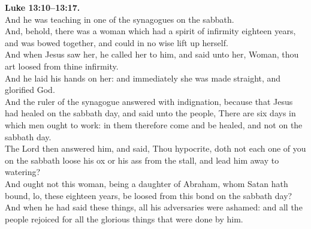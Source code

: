 \documentclass[10pt]{article} %
\begin{document}
{\begin{minipage}[t]{0.45\textwidth}
\textbf{Luke 13:10--13:17.}\\
And he was teaching in one of the synagogues on the sabbath.\\
And, behold, there was a woman which had a spirit of infirmity eighteen years, and was bowed together, and could in no wise lift up herself.\\
And when Jesus saw her, he called her to him, and said unto her, Woman, thou art loosed from thine infirmity.\\
And he laid his hands on her: and immediately she was made straight, and glorified God.\\
And the ruler of the synagogue answered with indignation, because that Jesus had healed on the sabbath day, and said unto the people, There are six days in which men ought to work: in them therefore come and be healed, and not on the sabbath day.\\
The Lord then answered him, and said, Thou hypocrite, doth not each one of you on the sabbath loose his ox or his ass from the stall, and lead him away to watering?\\
And ought not this woman, being a daughter of Abraham, whom Satan hath bound, lo, these eighteen years, be loosed from this bond on the sabbath day?\\
And when he had said these things, all his adversaries were ashamed: and all the people rejoiced for all the glorious things that were done by him.\\

\end{minipage}}
\vspace*{\fill}
\newpage
\Huge%
\vspace*{\fill}
\begin{spacing}{1.2}
\end{spacing}
\vspace*{\fill}
\end{document}
